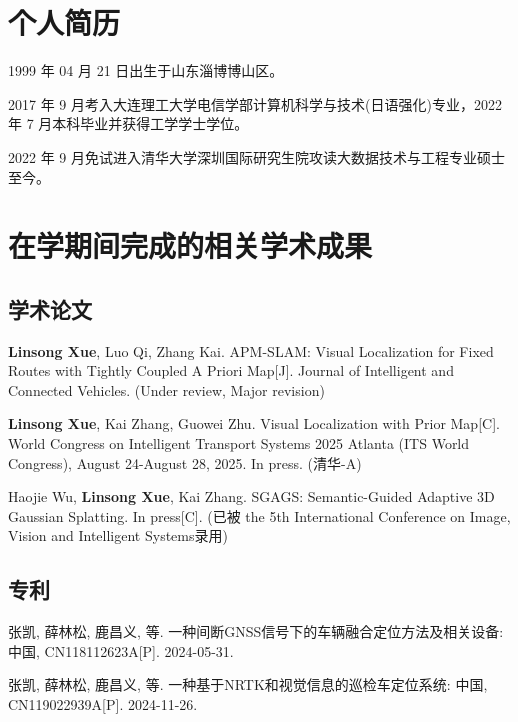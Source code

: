 
\begin{resume}

  \section*{个人简历}

  1999 年 04 月 21 日出生于山东淄博博山区。

  2017 年 9 月考入大连理工大学电信学部计算机科学与技术(日语强化)专业，2022 年 7 月本科毕业并获得工学学士学位。

  2022 年 9 月免试进入清华大学深圳国际研究生院攻读大数据技术与工程专业硕士至今。


  \section*{在学期间完成的相关学术成果}

  \subsection*{学术论文}

  \begin{achievements}
    \item \textbf{Linsong Xue}, Luo Qi, Zhang Kai. APM-SLAM: Visual Localization for Fixed Routes with Tightly Coupled A Priori Map[J]. Journal of Intelligent and Connected Vehicles. (Under review, Major revision)
    \item \textbf{Linsong Xue}, Kai Zhang, Guowei Zhu. Visual Localization with Prior Map[C]. World Congress on Intelligent Transport Systems 2025 Atlanta (ITS World Congress), August 24-August 28, 2025. In press. (清华-A)
    \item Haojie Wu, \textbf{Linsong Xue}, Kai Zhang. SGAGS: Semantic-Guided Adaptive 3D Gaussian Splatting. In press[C]. (已被 the 5th International Conference on Image, Vision and Intelligent Systems录用)
  \end{achievements}


  \subsection*{专利}

  \begin{achievements}
    \item 张凯, 薛林松, 鹿昌义, 等. 一种间断GNSS信号下的车辆融合定位方法及相关设备: 中国, CN118112623A[P]. 2024-05-31.
    \item 张凯, 薛林松, 鹿昌义, 等. 一种基于NRTK和视觉信息的巡检车定位系统: 中国, CN119022939A[P]. 2024-11-26.
  \end{achievements}

\end{resume}

